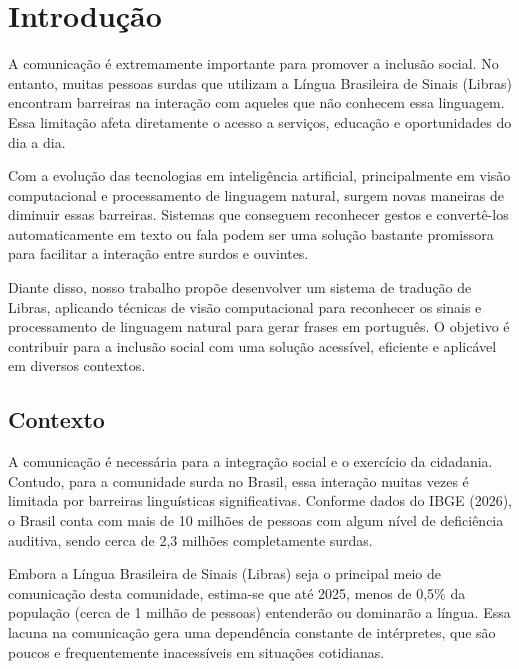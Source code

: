 \documentclass[
    12pt,                %
    openright,           %
    oneside,             %
    a4paper,             %
    english,             %
    brazil               %
]{abntex2}
\begin{document}
\textual

\chapter{Introdução}
\label{cap:introducao}

A comunicação é extremamente importante para promover a inclusão social. No entanto, muitas pessoas surdas que utilizam a Língua Brasileira de Sinais (Libras) encontram barreiras na interação com aqueles que não conhecem essa linguagem. Essa limitação afeta diretamente o acesso a serviços, educação e oportunidades do dia a dia. 

Com a evolução das tecnologias em inteligência artificial, principalmente em visão computacional e processamento de linguagem natural, surgem novas maneiras de diminuir essas barreiras. Sistemas que conseguem reconhecer gestos e convertê-los automaticamente em texto ou fala podem ser uma solução bastante promissora para facilitar a interação entre surdos e ouvintes. 

Diante disso, nosso trabalho propõe desenvolver um sistema de tradução de Libras, aplicando técnicas de visão computacional para reconhecer os sinais e processamento de linguagem natural para gerar frases em português. O objetivo é contribuir para a inclusão social com uma solução acessível, eficiente e aplicável em diversos contextos. 

\section{Contexto}
\label{sec:contexto}

A comunicação é necessária para a integração social e o exercício da cidadania. Contudo, para a comunidade surda no Brasil, essa interação muitas vezes é limitada por barreiras linguísticas significativas. Conforme dados do IBGE (2026), o Brasil conta com mais de 10 milhões de pessoas com algum nível de deficiência auditiva, sendo cerca de 2,3 milhões completamente surdas. 

Embora a Língua Brasileira de Sinais (Libras) seja o principal meio de comunicação desta comunidade, estima-se que até 2025, menos de 0,5\% da população (cerca de 1 milhão de pessoas) entenderão ou dominarão a língua. Essa lacuna na comunicação gera uma dependência constante de intérpretes, que são poucos e frequentemente inacessíveis em situações cotidianas. 
\end{document}
